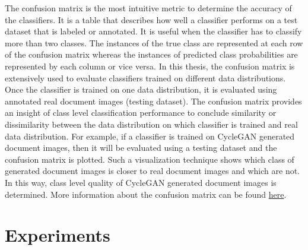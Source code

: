 The confusion matrix is the most intuitive metric to determine the accuracy of the classifiers. It is a table that describes how well a classifier performs on a test dataset that is labeled or annotated. It is useful when the classifier has to classify more than two classes. The instances of the true class are represented at each row of the confusion matrix whereas the instances of predicted class probabilities are represented by each column or vice versa. In this thesis, the confusion matrix is extensively used to evaluate classifiers trained on different data distributions. Once the classifier is trained on one data distribution, it is evaluated using annotated real document images (testing dataset). The confusion matrix provides an insight of class level classification performance to conclude similarity or dissimilarity between the data distribution on which classifier is trained and real data distribution. For example, if a classifier is trained on \ac{CycleGAN} generated document images, then it will be evaluated using a testing dataset and the confusion matrix is plotted. Such a visualization technique shows which class of generated document images is closer to real document images and which are not. In this way, class level quality of \ac{CycleGAN} generated document images is determined. More information about the confusion matrix can be found \href{https://en.wikipedia.org/wiki/Confusion_matrix}{here}.



\section{Experiments}\label{experiments}

